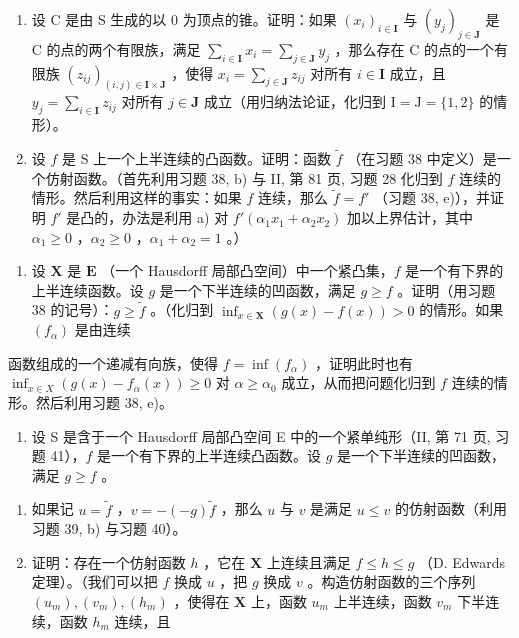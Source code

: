 \begin{enumerate}
\def\labelenumi{\alph{enumi})}
\item
  设 C 是由 S 生成的以 0 为顶点的锥。证明：如果 \((x_{i})_{i\in \mathbf{I}}\) 与 \((y_{j})_{j\in \mathbf{J}}\) 是 C 的点的两个有限族，满足 \(\sum_{i\in \mathbf{I}}x_i = \sum_{j\in \mathbf{J}}y_j\) ，那么存在 C 的点的一个有限族 \((z_{ij})_{(i,j)\in \mathbf{I}\times \mathbf{J}}\) ，使得 \(x_{i} = \sum_{j\in \mathbf{J}}z_{ij}\) 对所有 \(i\in \mathbf{I}\) 成立，且 \(y_{j} = \sum_{i\in \mathbf{I}}z_{ij}\) 对所有 \(j\in \mathbf{J}\) 成立（用归纳法论证，化归到 \(\mathrm{I} = \mathrm{J} = \{1,2\}\) 的情形）。
\item
  设 \(f\) 是 S 上一个上半连续的凸函数。证明：函数 \(\tilde{f}\) （在习题 38 中定义）是一个仿射函数。（首先利用习题 38, b) 与 II, 第 81 页, 习题 28 化归到 \(f\) 连续的情形。然后利用这样的事实：如果 \(f\) 连续，那么 \(\tilde{f} = f'\) （习题 38, e)），并证明 \(f'\) 是凸的，办法是利用 a) 对 \(f'(\alpha_1 x_1 + \alpha_2 x_2)\) 加以上界估计，其中 \(\alpha_1 \geqslant 0\) ，\(\alpha_2 \geqslant 0\) ，\(\alpha_1 + \alpha_2 = 1\) 。）
\end{enumerate}

\begin{enumerate}
\def\labelenumi{\arabic{enumi})}
\setcounter{enumi}{39}
\tightlist
\item
  设 \(\mathbf{X}\) 是 \(\mathbf{E}\) （一个 Hausdorff 局部凸空间）中一个紧凸集，\(f\) 是一个有下界的上半连续函数。设 \(g\) 是一个下半连续的凹函数，满足 \(g \geqslant f\) 。证明（用习题 38 的记号）：\(g \geqslant \tilde{f}\) 。（化归到 \(\inf_{x \in \mathbf{X}} (g(x) - f(x)) > 0\) 的情形。如果 \((f_{\alpha})\) 是由连续
\end{enumerate}

函数组成的一个递减有向族，使得 \(f = \inf(f_{\alpha})\) ，证明此时也有 \(\inf_{x \in X} (g(x) - f_{\alpha}(x)) \geqslant 0\) 对 \(\alpha \geqslant \alpha_0\) 成立，从而把问题化归到 \(f\) 连续的情形。然后利用习题 38, e)。

\begin{enumerate}
\def\labelenumi{\arabic{enumi})}
\setcounter{enumi}{40}
\tightlist
\item
  设 S 是含于一个 Hausdorff 局部凸空间 E 中的一个紧单纯形（II, 第 71 页, 习题 41），\(f\) 是一个有下界的上半连续凸函数。设 \(g\) 是一个下半连续的凹函数，满足 \(g \geqslant f\) 。
\end{enumerate}

\begin{enumerate}
\def\labelenumi{\alph{enumi})}
\item
  如果记 \(u = \tilde{f}\) ，\(v = -(-g)\tilde{f}\) ，那么 \(u\) 与 \(v\) 是满足 \(u \leqslant v\) 的仿射函数（利用习题 39, b) 与习题 40）。
\item
  证明：存在一个仿射函数 \(h\) ，它在 \(\mathbf{X}\) 上连续且满足 \(f \leqslant h \leqslant g\) （D. Edwards 定理）。（我们可以把 \(f\) 换成 \(u\) ，把 \(g\) 换成 \(v\) 。构造仿射函数的三个序列 \((u_m), (v_m), (h_m)\) ，使得在 \(\mathbf{X}\) 上，函数 \(u_m\) 上半连续，函数 \(v_m\) 下半连续，函数 \(h_m\) 连续，且
\end{enumerate}

